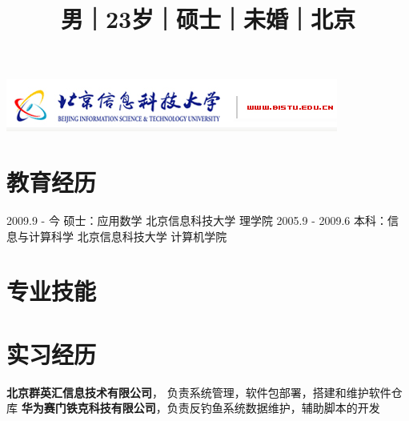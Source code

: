 \documentclass[a4paper]{moderncv}
\title{\small{男｜23岁｜硕士｜未婚｜北京}}
\begin{document}
\begin{CJK*}{UTF8}{gbsn}
\includegraphics{bistu_logo.png}

\maketitle

\section{教育经历}
\cventry
{2009.9 - 今} { 硕士：应用数学 } { 北京信息科技大学 } { 理学院 } {} {}
\cventry
{2005.9 - 2009.6} { 本科：信息与计算科学 } { 北京信息科技大学 }
{ 计算机学院 } {} {}
\section{专业技能}
\section{实习经历}
{ \textbf{北京群英汇信息技术有限公司}， 负责系统管理，软件包部署，搭建和维护软件仓库 }
{ \textbf{华为赛门铁克科技有限公司}，负责反钓鱼系统数据维护，辅助脚本的开发}

\end{CJK*}
\end{document}
